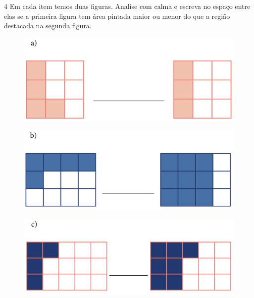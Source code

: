 \pagebreak
\num{4} Em cada item temos duas figuras. Analise com calma e escreva no
espaço entre elas se a primeira figura tem área pintada maior ou menor
do que a região destacada na segunda figura.

\begin{figure}[htpb!]
\centering
\includegraphics[width=.8\textwidth]{../ilustracoes/MAT5/SAEB_5ANO_MAT_figura69-1.png}
\end{figure}


\begin{figure}[htpb!]
\centering
\includegraphics[width=.8\textwidth]{../ilustracoes/MAT5/SAEB_5ANO_MAT_figura69-2.png}
\end{figure}


\begin{figure}[htpb!]
\centering
\includegraphics[width=.8\textwidth]{../ilustracoes/MAT5/SAEB_5ANO_MAT_figura69-3.png}
\end{figure}

